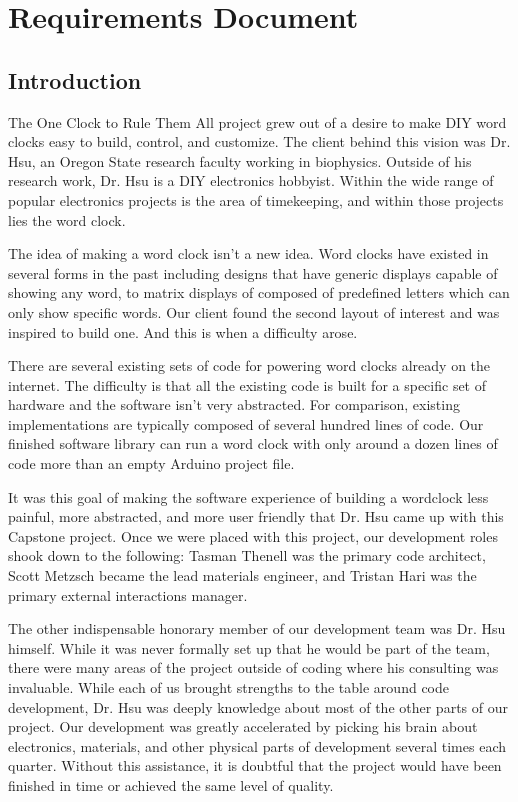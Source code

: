 \documentclass[onecolumn, draftclsnofoot,10pt, compsoc]{IEEEtran}
\begin{document}
\section{Requirements Document}
\subsection{Introduction}

The One Clock to Rule Them All project grew out of a desire to make DIY word clocks easy to build, control, and customize.
The client behind this vision was Dr. Hsu, an Oregon State research faculty working in biophysics. Outside of his research work, Dr. Hsu is a DIY electronics hobbyist.
Within the wide range of popular electronics projects is the area of timekeeping, and within those projects lies the word clock.
 
The idea of making a word clock isn’t a new idea.
Word clocks have existed in several forms in the past including designs that have generic displays capable of showing any word, to matrix displays of composed of predefined letters which can only show specific words.
Our client found the second layout of interest and was inspired to build one.
And this is when a difficulty arose.
 
There are several existing sets of code for powering word clocks already on the internet.
The difficulty is that all the existing code is built for a specific set of hardware and the software isn’t very abstracted.
For comparison, existing implementations are typically composed of several hundred lines of code.
Our finished software library can run a word clock with only around a dozen lines of code more than an empty Arduino project file.
 
It was this goal of making the software experience of building a wordclock less painful, more abstracted, and more user friendly that Dr. Hsu came up with this Capstone project.
Once we were placed with this project, our development roles shook down to the following: Tasman Thenell was the primary code architect, Scott Metzsch became the lead materials engineer, and Tristan Hari was the primary external interactions manager.
 
The other indispensable honorary member of our development team was Dr. Hsu himself.
While it was never formally set up that he would be part of the team, there were many areas of the project outside of coding where his consulting was invaluable.
While each of us brought strengths to the table around code development, Dr. Hsu was deeply knowledge about most of the other parts of our project.
Our development was greatly accelerated by picking his brain about electronics, materials, and other physical parts of development several times each quarter. Without this assistance, it is doubtful that the project would have been finished in time or achieved the same level of quality.
\end{document}
